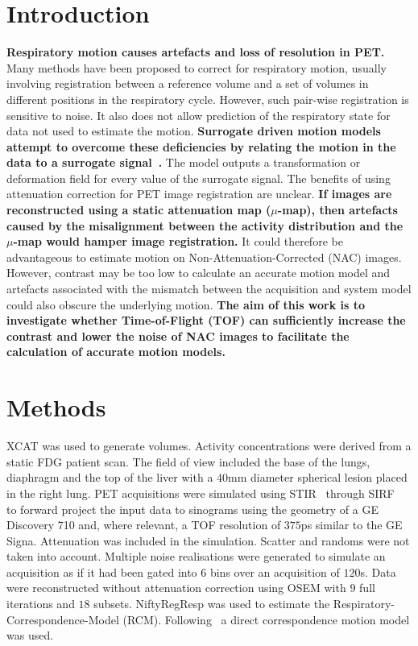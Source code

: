 \documentclass[portrait,color=UCLburgundy,margin=2cm]{uclposter}
\begin{document}
\begin{multicols}{4}
\large

\section*{Introduction}
\textcolor{UCLburgundy}{\textbf{Respiratory motion causes artefacts and loss of resolution in PET.}} Many methods have been proposed to correct for respiratory motion, usually involving registration between a reference volume and a set of volumes in different positions in the respiratory cycle. However, such pair-wise registration is sensitive to noise. It also does not allow prediction of the respiratory state for data not used to estimate the motion. \textcolor{UCLburgundy}{\textbf{Surrogate driven motion models attempt to overcome these deficiencies by relating the motion in the data to a surrogate signal~\cite{McClelland2013}.}} The model outputs a transformation or deformation field for every value of the surrogate signal. The benefits of using attenuation correction for PET image registration are unclear. \textcolor{UCLburgundy}{\textbf{If images are reconstructed using a static attenuation map ($\mu$-map), then artefacts caused by the misalignment between the activity distribution and the $\mu$-map would hamper image registration.}} It could therefore be advantageous to estimate motion on Non-Attenuation-Corrected (NAC) images. However, contrast may be too low to calculate an accurate motion model and artefacts associated with the mismatch between the acquisition and system model could also obscure the underlying motion. \textcolor{UCLburgundy}{\textbf{The aim of this work is to investigate whether Time-of-Flight (TOF) can sufficiently increase the contrast and lower the noise of NAC images to facilitate the calculation of accurate motion models.}}

\section*{Methods}
XCAT was used to generate volumes. Activity concentrations were derived from a static FDG patient scan. The field of view included the base of the lungs, diaphragm and the top of the liver with a $40$mm diameter spherical lesion placed in the right lung. PET acquisitions were simulated using STIR~\cite{Thielemans2012,Efthimiou2018} through SIRF~\cite{Ovtchinnikov2017} to forward project the input data to sinograms using the geometry of a GE Discovery 710 and, where relevant, a TOF resolution of $375$ps similar to the GE Signa. Attenuation was included in the simulation. Scatter and randoms were not taken into account. Multiple noise realisations were generated to simulate an acquisition as if it had been gated into $6$ bins over an acquisition of $120$s. Data were reconstructed without attenuation correction using OSEM with $9$ full iterations and $18$ subsets. NiftyRegResp was used to estimate the Respiratory-Correspondence-Model (RCM). Following~\cite{McClelland2013} a direct correspondence motion model was used.

\end{multicols}
\end{document}
